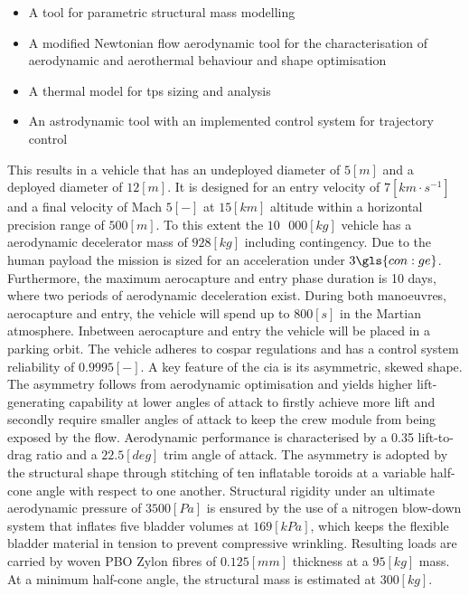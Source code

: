 \begin{itemize}
\item A tool for parametric structural mass modelling
\item A modified Newtonian flow aerodynamic tool for the characterisation of aerodynamic and aerothermal behaviour and shape optimisation
\item A thermal model for \acrfull{tps} sizing and analysis
\item An astrodynamic tool with an implemented control system for trajectory control
\end{itemize}
\vspace{1mm}
This results in a vehicle that has an undeployed diameter of $5 \left[ m \right] $ and a deployed diameter of $12 \left[ m \right]$. It is designed for an entry velocity of $7 \left[ km \cdot s^{-1} \right]$ and a final velocity of Mach $5 \left[-\right]$ at  $15 \left[ km \right] $ altitude within a horizontal precision range of $500 \left[ m \right]$. To this extent the $10\mbox{ }000 \left[ kg \right]$ vehicle has a aerodynamic decelerator mass of $928 \left[ kg \right] $ including contingency. Due to the human payload the mission is sized for an acceleration under $3 \gls{con:ge}$. Furthermore, the maximum aerocapture and entry phase duration is 10 days, where two periods of aerodynamic deceleration exist. During both manoeuvres, aerocapture and entry, the vehicle will spend up to $800 \left[ s \right]$ in the Martian atmosphere. Inbetween aerocapture and entry the vehicle will be placed in a parking orbit. The vehicle adheres to \acrshort{cospar} regulations and has a control system reliability of $0.9995 \left[ - \right] $.
\newline
\newline
A key feature of the \acrshort{cia} is its asymmetric, skewed shape. The asymmetry follows from aerodynamic optimisation and yields higher lift-generating capability at lower angles of attack to firstly achieve more lift and secondly require smaller angles of attack to keep the crew module from being exposed by the flow. Aerodynamic performance is characterised by a 0.35 lift-to-drag ratio and a $22.5\left[deg\right]$ trim angle of attack.
\newline
\newline
The asymmetry is adopted by the structural shape through stitching of ten inflatable toroids at a variable half-cone angle with respect to one another. Structural rigidity under an ultimate aerodynamic pressure of $3500 \left[Pa\right]$ is ensured by the use of a nitrogen blow-down system that inflates five bladder volumes at $169 \left[kPa\right]$, which keeps the flexible bladder material in tension to prevent compressive wrinkling. Resulting loads are carried by woven PBO Zylon\textsuperscript{\textregistered} fibres of $0.125 \left[mm\right]$ thickness at a $95 \left[kg\right]$ mass. At a minimum half-cone angle, the structural mass is estimated at $300 \left[kg\right]$. 

